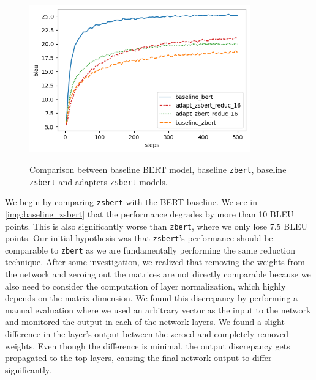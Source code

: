\begin{figure}[]
    {\includegraphics[width=0.85\textwidth]{img/adapter_zsbert.png}}
    \centering
    \caption{Comparison between baseline BERT model, baseline \texttt{zbert}, baseline \texttt{zsbert} and adapters \texttt{zsbert} models.}
    \label{img:adapter_zsbert}
\end{figure}


We begin by comparing \texttt{zsbert} with the BERT baseline. We see in \cref{img:baseline_zsbert} that the performance degrades by more than 10 BLEU points. This is also significantly worse than \texttt{zbert}, where we only lose 7.5 BLEU points. Our initial hypothesis was that \texttt{zsbert}'s performance should be comparable to \texttt{zbert} as we are fundamentally performing the same reduction technique. After some investigation, we realized that removing the weights from the network and zeroing out the matrices are not directly comparable because we also need to consider the computation of layer normalization, which highly depends on the matrix dimension. We found this discrepancy by performing a manual evaluation where we used an arbitrary vector as the input to the network and monitored the output in each of the network layers. We found a slight difference in the layer's output between the zeroed and completely removed weights. Even though the difference is minimal, the output discrepancy gets propagated to the top layers, causing the final network output to differ significantly.

